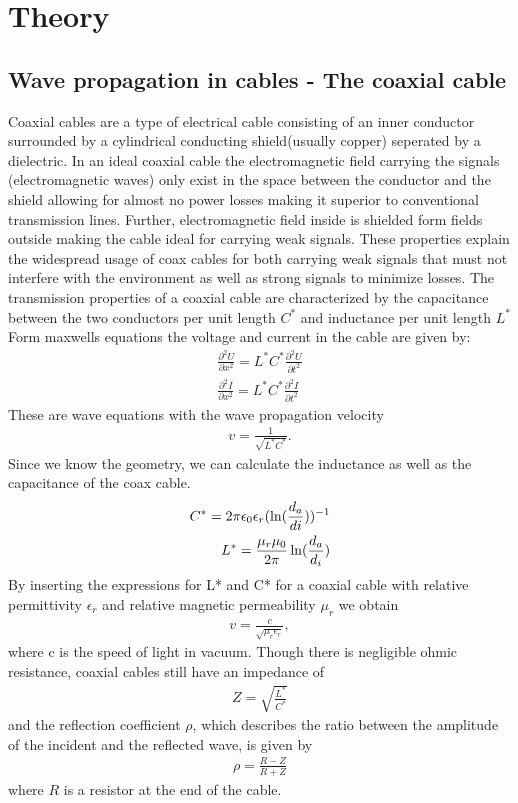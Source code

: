 \documentclass[a4paper,10pt,twocolumn]{article}
\begin{document}
    \section{Theory}
    \subsection{Wave propagation in cables - The coaxial cable}
    Coaxial cables are a type of electrical cable consisting of an inner conductor surrounded by a cylindrical conducting shield(usually copper) seperated by a dielectric. In an ideal coaxial
    cable the electromagnetic field carrying the signals (electromagnetic waves) only exist in the space between the conductor and the shield allowing for almost no power losses making it superior to conventional
    transmission lines. 
    Further, electromagnetic field inside is shielded form fields outside making the cable ideal for carrying weak signals.
    These properties explain the widespread usage of coax cables for both carrying weak signals that must not interfere with the environment as well as strong signals to minimize losses.
    The transmission properties of a coaxial cable are characterized by the capacitance between the two conductors per unit length $C^*$ and inductance per unit length $L^*$
    Form maxwells equations the voltage and current in the cable are given by:
    \begin{align*}
        \frac{\partial^2U}{\partial x^2}=L^*C^*\frac{\partial^2U}{\partial t^2}\\
        \frac{\partial^2I}{\partial x^2}=L^*C^*\frac{\partial^2I}{\partial t^2}
    \end{align*}
    These are wave equations with the wave propagation velocity
    \begin{align}
        \label{coaxial:vel}
        v = \frac{1}{\sqrt{L^*C^*}}.
    \end{align}
    Since we know the geometry, we can calculate the inductance as well as the capacitance of the coax cable.
    \begin{align}
        C^* = 2\pi\epsilon_0\epsilon_r (\ln(\frac{d_a}{di}))^{-1}\endline
        L^* = \frac{\mu_r\mu_0}{2\pi}\ln(\frac{d_a}{d_i})
        \end{align}
    By inserting the expressions for L* and C* for a coaxial cable with relative permittivity $\epsilon_r$ and relative magnetic permeability $\mu_r$ we obtain
    \begin{align}
        \label{eq:vel_mat}
        v = \frac{c}{\sqrt{\mu_r\epsilon_r}},
    \end{align}
    where c is the speed of light in vacuum.
    Though there is negligible ohmic resistance, coaxial cables still have an impedance of
    \begin{align}
        Z=\sqrt{\frac{L^*}{C^*}}
    \end{align}
    and the reflection coefficient $\rho$, which describes the ratio between the amplitude of the incident and the reflected wave, is given by
    \begin{align}
        \label{eq:coaxRef}
        \rho=\frac{R-Z}{R+Z}
    \end{align}
    where $R$ is a resistor at the end of the cable.
\end{document}
